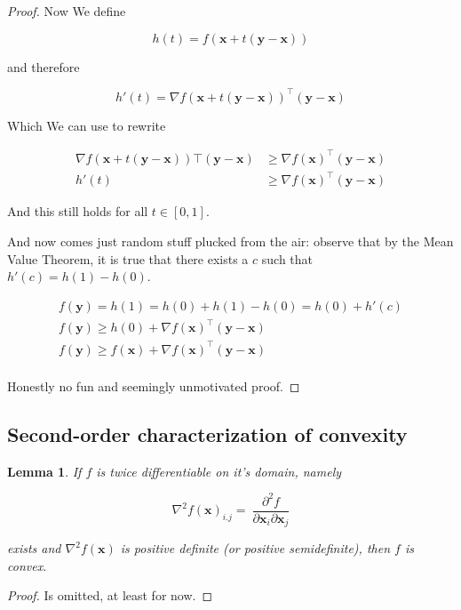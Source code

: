 \documentclass{article}
\newtheorem{lemma}[theorem]{Lemma}
\begin{document}
\begin{proof}
			Now We define 
			
			\[ h(t) = f(\mathbf{x} + t(\mathbf{y-x})) \]
			
			and therefore 
			
			\[ h'(t) = \nabla  f(\mathbf{x} + t(\mathbf{y-x}))^\top(\mathbf{y-x}) \]
			
			Which We can use to rewrite
			
			\begin{align*}
				\nabla f(\mathbf{x} + t(\mathbf{y-x}))\top (\mathbf{y-x})  &\ge  \nabla f(\mathbf{x})^\top (\mathbf{y-x}) \\
				h'(t)  &\ge  \nabla f(\mathbf{x})^\top (\mathbf{y-x}) 
			\end{align*}
			
			And this still holds for all $t\in [0, 1]$.
			
			And now comes just random stuff plucked from the air: observe that by the Mean Value Theorem, it is true that there exists a $c$ such that $h'(c) = h(1) - h(0)$.
			
			\begin{align*}
				f(\mathbf{y}) = h(1) = h(0) + h(1) - h(0) = h(0) + h'(c)\\
				f(\mathbf{y}) \ge h(0) +\nabla f(\mathbf{x})^\top (\mathbf{y-x}) \\
				f(\mathbf{y}) \ge f(\mathbf{x}) +\nabla f(\mathbf{x})^\top (\mathbf{y-x}) \\
			\end{align*}
			
			Honestly no fun and seemingly unmotivated proof. 
		\end{proof}
		
	\subsection{Second-order characterization of convexity}
	
		\begin{lemma}
			If $f$ is twice differentiable on it's domain, namely
			
			\[ \nabla^2 f(\mathbf{x})_{i. j} =  \ \frac{\partial^2 f}{\partial \mathbf{x}_i \partial \mathbf{x}_j}  \]
			
			exists and $\nabla^2 f(\mathbf{x})$ is positive definite (or positive semidefinite), then $f$ is convex.
		\end{lemma}
		
		\begin{proof}
			Is omitted, at least for now.
		\end{proof}
		
\end{document}
